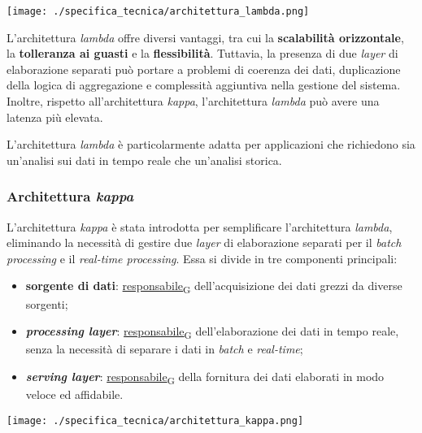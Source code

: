 \begin{center}
	\texttt{[image: ./specifica\_tecnica/architettura\_lambda.png]}
\end{center}

L'architettura \textit{lambda} offre diversi vantaggi, tra cui la \textbf{scalabilità orizzontale}, la \textbf{tolleranza ai guasti} e la \textbf{flessibilità}. Tuttavia, la presenza
di due \textit{layer} di elaborazione separati può portare a problemi di coerenza dei dati, duplicazione della logica di aggregazione e complessità aggiuntiva nella gestione del sistema.
Inoltre, rispetto all'architettura \textit{kappa}, l'architettura \textit{lambda} può avere una latenza più elevata.

L'architettura \textit{lambda} è particolarmente adatta per applicazioni che richiedono sia un'analisi sui dati in tempo reale che un'analisi storica.

\subsubsection{Architettura \textit{kappa}}
L'architettura \textit{kappa} è stata introdotta per semplificare l'architettura \textit{lambda}, eliminando la necessità di gestire due \textit{layer} di elaborazione separati per il \textit{batch processing} e il \textit{real-time processing}.
Essa si divide in tre componenti principali:
\begin{itemize}
	\item \textbf{sorgente di dati}: \href{https://7last.github.io/docs/pb/documentazione-interna/glossario\#responsabile}{responsabile\textsubscript{G}} dell'acquisizione dei dati grezzi da diverse sorgenti;
	\item \textbf{\textit{processing layer}}: \href{https://7last.github.io/docs/pb/documentazione-interna/glossario\#responsabile}{responsabile\textsubscript{G}} dell'elaborazione dei dati in tempo reale, senza la necessità di separare i dati in \textit{batch} e \textit{real-time};
	\item \textbf{\textit{serving layer}}: \href{https://7last.github.io/docs/pb/documentazione-interna/glossario\#responsabile}{responsabile\textsubscript{G}} della fornitura dei dati elaborati in modo veloce ed affidabile.
\end{itemize}

\begin{center}
	\texttt{[image: ./specifica\_tecnica/architettura\_kappa.png]}
\end{center}

